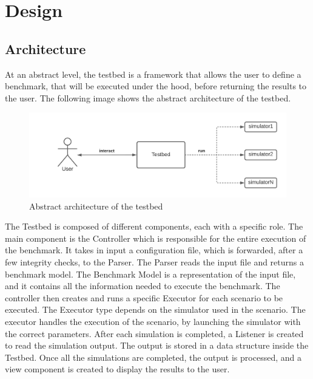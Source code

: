 \documentclass[12pt,a4paper,openright,twoside]{book}
\begin{document}
\chapter{Design}

\section{Architecture}

At an abstract level, the testbed is a framework that allows the user to define a benchmark, that will be executed under the hood, before returning the results to the user.
The following image shows the abstract architecture of the testbed.

\begin{figure}[h]
  \centering
  \includegraphics[width=\textwidth]{figures/architecture-high-level.png}
  \caption{Abstract architecture of the testbed}
\end{figure}

The Testbed is composed of different components, each with a specific role.
The main component is the Controller which is responsible for the entire execution of the benchmark. It takes in input a configuration file, which is forwarded, after a few integrity checks, to the Parser.
The Parser reads the input file and returns a benchmark model. The Benchmark Model is a representation of the input file, and it contains all the information needed to execute the benchmark.
The controller then creates and runs a specific Executor for each scenario to be executed. The Executor type depends on the simulator used in the scenario.
The executor handles the execution of the scenario, by launching the simulator with the correct parameters.
After each simulation is completed, a Listener is created to read the simulation output. The output is stored in a data structure inside the Testbed.
Once all the simulations are completed, the output is processed, and a view component is created to display the results to the user.
\end{document}
